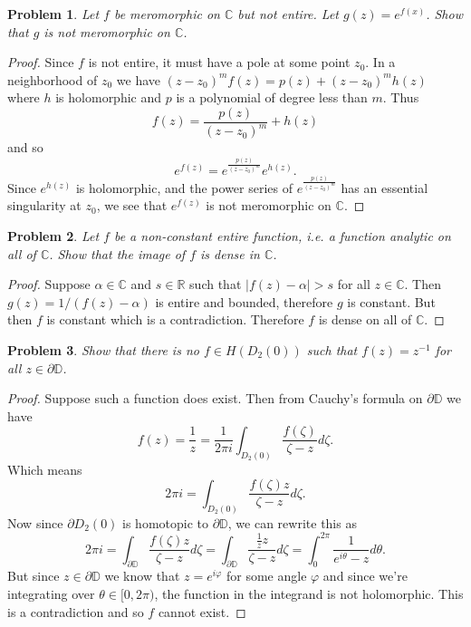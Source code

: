 \documentclass{article}
\newtheorem{problem}{Problem}
\begin{document}
\begin{problem}
Let $f$ be meromorphic on $\mathbb{C}$ but not entire. Let $g(z) = e^{f(x)}$. Show that $g$ is not meromorphic on $\mathbb{C}$.
\end{problem}
\begin{proof}
Since $f$ is not entire, it must have a pole at some point $z_0$. In a neighborhood of $z_0$ we have $(z-z_0)^m f(z) = p(z) + (z-z_0)^mh(z)$ where $h$ is holomorphic and $p$ is a polynomial of degree less than $m$. Thus
\[
f(z) = \frac{p(z)}{(z-z_0)^m} + h(z)
\]
and so
\[
e^{f(z)} = e^{\frac{p(z)}{(z-z_0)^m}}e^{h(z)}.
\]
Since $e^{h(z)}$ is holomorphic, and the power series of $e^{\frac{p(z)}{(z-z_0)^m}}$ has an essential singularity at $z_0$, we see that $e^{f(z)}$ is not meromorphic on $\mathbb{C}$.
\end{proof}

\begin{problem}
Let $f$ be a non-constant entire function, i.e. a function analytic on all of $\mathbb{C}$. Show that the image of $f$ is dense in $\mathbb{C}$.
\end{problem}
\begin{proof}
Suppose $\alpha \in \mathbb{C}$ and $s \in \mathbb{R}$ such that $|f(z) - \alpha| > s$ for all $z \in \mathbb{C}$. Then $g(z) = 1/(f(z) - \alpha)$ is entire and bounded, therefore $g$ is constant. But then $f$ is constant which is a contradiction. Therefore $f$ is dense on all of $\mathbb{C}$.
\end{proof}

\begin{problem}
Show that there is no $f \in H(D_2(0))$ such that $f(z) = z^{-1}$ for all $z \in \partial \mathbb{D}$.
\end{problem}
\begin{proof}
Suppose such a function does exist. Then from Cauchy's formula on $\partial \mathbb{D}$ we have
\[
f(z) = \frac{1}{z} = \frac{1}{2 \pi i} \int_{D_2(0)} \frac{f(\zeta)}{\zeta - z} d \zeta.
\]
Which means
\[
2 \pi i = \int_{D_2(0)} \frac{f(\zeta)z}{\zeta - z} d \zeta.
\]
Now since $\partial D_2(0)$ is homotopic to $\partial \mathbb{D}$, we can rewrite this as
\[
2 \pi i = \int_{\partial \mathbb{D}} \frac{f(\zeta)z}{\zeta - z} d \zeta = \int_{\partial \mathbb{D}} \frac{\frac{1}{z}z}{\zeta - z} d \zeta = \int_{0}^{2 \pi} \frac{1}{e^{i \theta} - z} d \theta.
\]
But since $z \in \partial \mathbb{D}$ we know that $z = e^{i \varphi}$ for some angle $\varphi$ and since we're integrating over $\theta \in [0, 2 \pi)$, the function in the integrand is not holomorphic. This is a contradiction and so $f$ cannot exist.
\end{proof}
\end{document}
